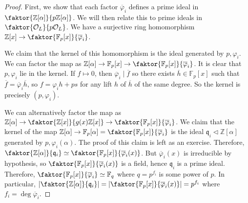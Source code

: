 \begin{proof}
    First, we show that each factor \( \overline\varphi_i \) defines a prime ideal in \( \faktor{\mathbb Z[\alpha]}{p\mathbb Z[\alpha]} \).
    We will then relate this to prime ideals in \( \faktor{\mathcal O_L}{p\mathcal O_L} \).
    We have a surjective ring homomorphism \( \mathbb Z[x] \to \faktor{\mathbb F_p[x]}{\overline \varphi_i} \).
    
    We claim that the kernel of this homomorphism is the ideal generated by \( p, \varphi_i \).
    We can factor the map as \( \mathbb Z[\alpha] \to \mathbb F_p[x] \to \faktor{\mathbb F_p[x]}{\overline \varphi_i} \).
    It is clear that \( p, \varphi_i \) lie in the kernel.
    If \( f \mapsto 0 \), then \( \overline \varphi_i \mid \overline f \) so there exists \( \overline h \in \mathbb F_p[x] \) such that \( \overline f = \overline \varphi_i \overline h \), so \( f = \varphi_i h + p s \) for any lift \( h \) of \( \overline h \) of the same degree.
    So the kernel is precisely \( (p, \varphi_i) \).

    We can alternatively factor the map as \( \mathbb Z[\alpha] \to \faktor{\mathbb Z[x]}{g(x) \mathbb Z[x]} \to \faktor{\mathbb F_p[x]}{\overline \varphi_i} \).
    We claim that the kernel of the map \( \mathbb Z[\alpha] \to \mathbb F_p[\alpha] = \faktor{\mathbb F_p[x]}{\overline \varphi_i} \) is the ideal \( \mathfrak q_i \triangleleft \mathbb Z[\alpha] \) generated by \( p, \varphi_i(\alpha) \).
    The proof of this claim is left as an exercise.
    Therefore, \( \faktor{\mathbb Z[\alpha]}{\mathfrak q_i} \simeq \faktor{\mathbb F_p[x]}{\overline \varphi_i(x)} \).
    But \( \overline \varphi_i(x) \) is irreducible by hypothesis, so \( \faktor{\mathbb F_p[x]}{\overline \varphi_i(x)} \) is a field, hence \( \mathfrak q_i \) is a prime ideal.
    Therefore, \( \faktor{\mathbb F_p[x]}{\overline\varphi_i} \simeq \mathbb F_q \) where \( q = p^{f_i} \) is some power of \( p \).
    In particular, \( \abs{\faktor{\mathbb Z[\alpha]}{\mathfrak q_i}} = \abs{\faktor{\mathbb F_p[x]}{\overline\varphi_i(x)}} = p^{f_i} \) where \( f_i = \deg \overline\varphi_i \).


\end{proof}
